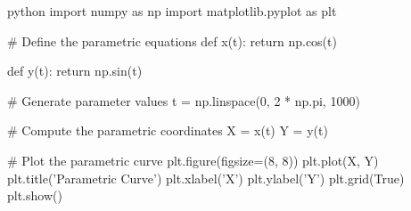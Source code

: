 python
import numpy as np
import matplotlib.pyplot as plt

# Define the parametric equations
def x(t):
    return np.cos(t)

def y(t):
    return np.sin(t)

# Generate parameter values
t = np.linspace(0, 2 * np.pi, 1000)

# Compute the parametric coordinates
X = x(t)
Y = y(t)

# Plot the parametric curve
plt.figure(figsize=(8, 8))
plt.plot(X, Y)
plt.title('Parametric Curve')
plt.xlabel('X')
plt.ylabel('Y')
plt.grid(True)
plt.show()